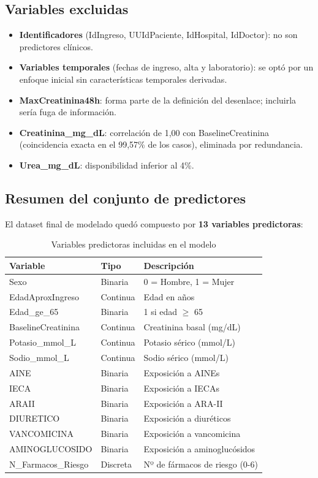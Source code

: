 \documentclass[12pt, a4paper, oneside]{report}
\begin{document}
\subsection{Variables excluidas}

\begin{itemize}
    \item \textbf{Identificadores} (IdIngreso, UUIdPaciente, IdHospital, IdDoctor): no son predictores clínicos.
    \item \textbf{Variables temporales} (fechas de ingreso, alta y laboratorio): se optó por un enfoque inicial sin características temporales derivadas.
    \item \textbf{MaxCreatinina48h}: forma parte de la definición del desenlace; incluirla sería fuga de información.
    \item \textbf{Creatinina\_mg\_dL}: correlación de 1,00 con BaselineCreatinina (coincidencia exacta en el 99,57\% de los casos), eliminada por redundancia.
    \item \textbf{Urea\_mg\_dL}: disponibilidad inferior al 4\%.
\end{itemize}

\subsection{Resumen del conjunto de predictores}

El dataset final de modelado quedó compuesto por \textbf{13 variables predictoras}:

\begin{table}[h]
\centering
\begin{tabular}{lll}
\hline
\textbf{Variable} & \textbf{Tipo} & \textbf{Descripción} \\
\hline
Sexo & Binaria & 0 = Hombre, 1 = Mujer \\
EdadAproxIngreso & Continua & Edad en años \\
Edad\_ge\_65 & Binaria & 1 si edad $\geq$ 65 \\
BaselineCreatinina & Continua & Creatinina basal (mg/dL) \\
Potasio\_mmol\_L & Continua & Potasio sérico (mmol/L) \\
Sodio\_mmol\_L & Continua & Sodio sérico (mmol/L) \\
AINE & Binaria & Exposición a AINEs \\
IECA & Binaria & Exposición a IECAs \\
ARAII & Binaria & Exposición a ARA-II \\
DIURETICO & Binaria & Exposición a diuréticos \\
VANCOMICINA & Binaria & Exposición a vancomicina \\
AMINOGLUCOSIDO & Binaria & Exposición a aminoglucósidos \\
N\_Farmacos\_Riesgo & Discreta & Nº de fármacos de riesgo (0-6) \\
\hline
\end{tabular}
\caption{Variables predictoras incluidas en el modelo}
\label{tab:variables}
\end{table}
\end{document}
